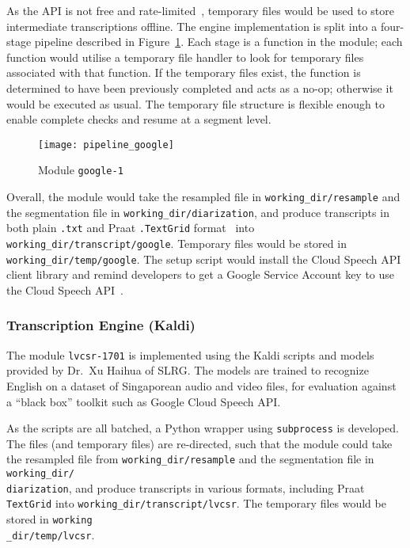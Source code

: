 As the API is not free and rate-limited~\cite{gcs-free}, temporary files
would be used to store intermediate transcriptions offline. The engine
implementation is split into a four-stage pipeline described in
Figure~\ref{google}. Each stage is a function in the module; each function
would utilise a temporary file handler to look for temporary files
associated with that function. If the temporary files exist, the function
is determined to have been previously completed and acts as a no-op;
otherwise it would be executed as usual. The temporary file structure is
flexible enough to enable complete checks and resume at a segment level.

\begin{figure}[ht]
\begin{center}
    \texttt{[image: pipeline\_google]}
    \caption{Module \texttt{google-1}}\label{google}
\end{center}
\end{figure}

Overall, the module would take the resampled file in
\texttt{working\_dir/resample} and the segmentation file in
\texttt{working\_dir/diarization}, and produce transcripts in both
plain \texttt{.txt} and Praat \texttt{.TextGrid} format~\cite{praat}
into \texttt{working\_dir/transcript/google}.
Temporary files would be stored in \texttt{working\_dir/temp/google}.
The setup script would install the Cloud Speech API client library and
remind developers to get a Google Service Account key to use the
Cloud Speech API~\cite{gcs-api-key}.

\subsubsection{Transcription Engine (Kaldi)}

The module \texttt{lvcsr-1701} is implemented using the Kaldi 
scripts and models provided by Dr.\ Xu Haihua of SLRG\@. The models
are trained to recognize English on a dataset of Singaporean audio and
video files, for evaluation against a ``black box'' toolkit such as
Google Cloud Speech API\@.

As the scripts are all batched, a Python wrapper using \texttt{subprocess}
is developed. The files (and temporary files) are re-directed, such that
the module could take the resampled file from \texttt{working\_dir/resample}
and the segmentation file in \texttt{working\_dir/\\diarization}, and produce
transcripts in various formats, including Praat \texttt{TextGrid} into
\texttt{working\_dir/transcript/lvcsr}. The temporary files would be stored
in \texttt{working\\ \_dir/temp/lvcsr}.

